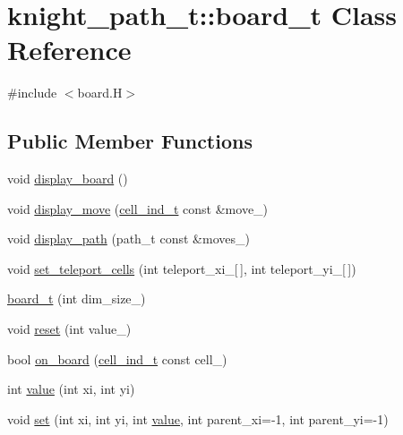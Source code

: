 \hypertarget{classknight__path__t_1_1board__t}{\section{knight\-\_\-path\-\_\-t\-:\-:board\-\_\-t \-Class \-Reference}
\label{classknight__path__t_1_1board__t}
}


{\ttfamily \#include $<$board.\-H$>$}

\subsection*{\-Public \-Member \-Functions}
\begin{DoxyCompactItemize}
\item 
void \hyperlink{classknight__path__t_1_1board__t_a23079906cb89269c288689b4d95f9793}{display\-\_\-board} ()
\item 
void \hyperlink{classknight__path__t_1_1board__t_a6bd6eb1e0433e2ce3082eb4305fe252b}{display\-\_\-move} (\hyperlink{structknight__path__t_1_1cell__ind__t}{cell\-\_\-ind\-\_\-t} const \&move\-\_\-)
\item 
void \hyperlink{classknight__path__t_1_1board__t_ac7b3bc7fb3021a8db5ade95779b831ba}{display\-\_\-path} (path\-\_\-t const \&moves\-\_\-)
\item 
void \hyperlink{classknight__path__t_1_1board__t_a09090861cc5b6662ed419bf9c26f5828}{set\-\_\-teleport\-\_\-cells} (int teleport\-\_\-xi\-\_\-\mbox{[}$\,$\mbox{]}, int teleport\-\_\-yi\-\_\-\mbox{[}$\,$\mbox{]})
\item 
\hyperlink{classknight__path__t_1_1board__t_a60bcd19456f29df0ece7e1c44899927b}{board\-\_\-t} (int dim\-\_\-size\-\_\-)
\item 
void \hyperlink{classknight__path__t_1_1board__t_afa5671cd678fdb5fc1d0cdc18f948c47}{reset} (int value\-\_\-)
\item 
bool \hyperlink{classknight__path__t_1_1board__t_ae823e0e0e3f5ad86f06e93c801d397ca}{on\-\_\-board} (\hyperlink{structknight__path__t_1_1cell__ind__t}{cell\-\_\-ind\-\_\-t} const cell\-\_\-)
\item 
int \hyperlink{classknight__path__t_1_1board__t_a419dcfbebef7aa7c3323fa617f6471e7}{value} (int xi, int yi)
\item 
void \hyperlink{classknight__path__t_1_1board__t_a87c70e59faa630a8e71080f5b89939be}{set} (int xi, int yi, int \hyperlink{classknight__path__t_1_1board__t_a419dcfbebef7aa7c3323fa617f6471e7}{value}, int parent\-\_\-xi=-\/1, int parent\-\_\-yi=-\/1)

\end{DoxyCompactItemize}
